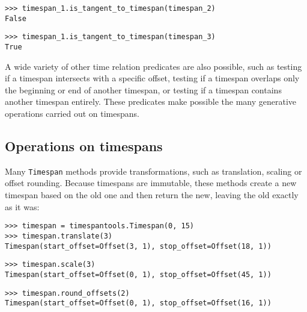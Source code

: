 \begin{comment}
<abjad>
timespan_1.is_tangent_to_timespan(timespan_2)
timespan_1.is_tangent_to_timespan(timespan_3)
</abjad>
\end{comment}

\begin{singlespacing}
\vspace{-0.5\baselineskip}
\begin{lstlisting}
>>> timespan_1.is_tangent_to_timespan(timespan_2)
False
\end{lstlisting}
\begin{lstlisting}
>>> timespan_1.is_tangent_to_timespan(timespan_3)
True
\end{lstlisting}
\end{singlespacing}

\noindent A wide variety of other time relation predicates are also possible,
such as testing if a timespan intersects with a specific offset, testing if a
timespan overlaps only the beginning or end of another timespan, or testing if
a timespan contains another timespan entirely. These predicates make possible
the many generative operations carried out on timespans.

\subsection{Operations on timespans} %
\label{sec:operations-on-timespans}

Many \texttt{Timespan} methods provide transformations, such as translation,
scaling or offset rounding. Because timespans are immutable, these methods
create a new timespan based on the old one and then return the new, leaving
the old exactly as it was:

\begin{comment}
<abjad>
timespan = timespantools.Timespan(0, 15)
timespan.translate(3)
timespan.scale(3)
timespan.round_offsets(2)
</abjad>
\end{comment}

\begin{singlespacing}
\vspace{-0.5\baselineskip}
\begin{lstlisting}
>>> timespan = timespantools.Timespan(0, 15)
>>> timespan.translate(3)
Timespan(start_offset=Offset(3, 1), stop_offset=Offset(18, 1))
\end{lstlisting}
\begin{lstlisting}
>>> timespan.scale(3)
Timespan(start_offset=Offset(0, 1), stop_offset=Offset(45, 1))
\end{lstlisting}
\begin{lstlisting}
>>> timespan.round_offsets(2)
Timespan(start_offset=Offset(0, 1), stop_offset=Offset(16, 1))
\end{lstlisting}
\end{singlespacing}

